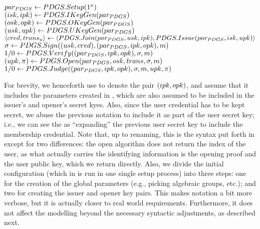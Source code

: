 \begin{description}
\item[$par_{PDGS} \leftarrow PDGS.Setup(1^\kappa)$]
\item[$(isk, ipk) \leftarrow PDGS.IKeyGen(par_{PDGS})$]
\item[$(osk, opk) \leftarrow PDGS.OKeyGen(par_{PDGS})$]
\item[$(usk, upk) \leftarrow PDGS.UKeyGen(par_{PDGS})$]
\item[$\langle cred, trans_u \rangle \leftarrow
  \langle PDGS.Join(par_{PDGS}, usk, ipk),
  PDGS.Issue(par_{PDGS}, isk, upk) \rangle$]
\item[$\sigma \leftarrow PDGS.Sign((usk, cred),
  (par_{PDGS}, ipk, opk), m)$]
\item[$1/0 \leftarrow PDGS.Verify((par_{PDGS}, ipk, opk), \sigma, m)$]
\item[$(upk, \pi) \leftarrow PDGS.Open(par_{PDGS}, osk, trans, \sigma, m)$]
\item[$1/0 \leftarrow PDGS.Judge((par_{PDGS}, ipk, opk),
  \sigma, m, upk, \pi)$]
\end{description}


For brevity, we henceforth use \PDGSgpk to denote the pair $(ipk,opk)$,
and assume that it includes the parameters created in \PDGSSetup, which are also
assumed to be included in the issuer's and opener's secret kyes.
Also, since the user credential has to be kept secret, we abuse the previous
notation to include it as part of the user secret key; i.e., we can see the
\PDGSJoin as ``expanding'' the previous user secret key to include the
membership credential. Note that, up to renaming, this is the syntax put forth
in \cite{bsz05} except for two differences: the open algorithm does not return
the index of the user, as what actually carries the identifying information is
the opening proof and the user public key, which we return directly. Also, we
divide the initial configuration (which in \cite{bsz05} is run in one single
setup process) into three steps: one for the creation of the global parameters
(e.g., picking algebraic groups, etc.); and two for creating the issuer and
opener key pairs. This makes notation a bit more verbose, but it is actually
closer to real world requirements. Furthermore, it does not affect the modelling
beyond the necessary syntactic adjustments, as described next.

